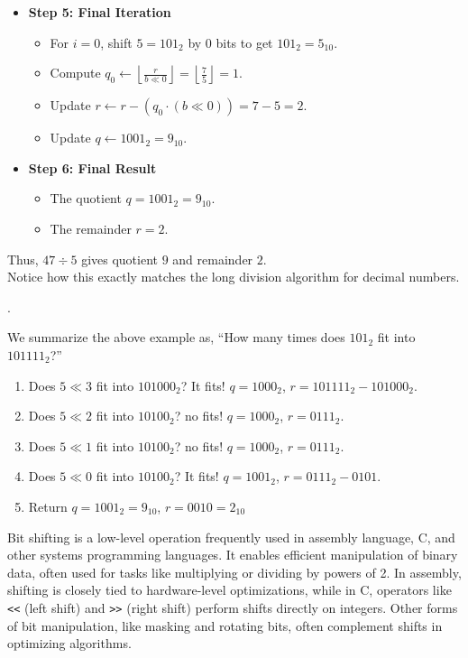 \begin{itemize}
    \item \textbf{Step 5: Final Iteration}
    \begin{itemize}
        \item For $i = 0$, shift $5 = 101_2$ by $0$ bits to get $101_2 = 5_{10}$.
        \item Compute $q_0 \gets \left\lfloor \frac{r}{b \ll 0} \right\rfloor = \left\lfloor \frac{7}{5} \right\rfloor = 1$.
        \item Update $r \gets r - (q_0 \cdot (b \ll 0)) = 7 - 5 = 2$.
        \item Update $q \gets 1001_2 = 9_{10}$.
    \end{itemize}
    
    \item \textbf{Step 6: Final Result}
    \begin{itemize}
        \item The quotient $q = 1001_2 = 9_{10}$.
        \item The remainder $r = 2$.
    \end{itemize}
\end{itemize}

\noindent
Thus, $47 \div 5$ gives quotient $9$ and remainder $2$.\\
Notice how this exactly matches the long division algorithm for decimal numbers.\\
\begin{center}
    .
\end{center}
We summarize the above example as, ``How many times does $101_2$ fit into $101111_2$?''
\begin{enumerate}
    \item  Does $5\ll 3$ fit into $101000_2$? It fits! $q=1000_2$, $r = 101111_2 - 101000_2$.
    \item  Does $5\ll 2$ fit into $10100_2$? no fits! $q=1000_2$, $r = 0111_2$.
    \item  Does $5\ll 1$ fit into $10100_2$? no fits! $q=1000_2$, $r = 0111_2$.
    \item  Does $5\ll 0$ fit into $10100_2$? It fits! $q=1001_2$, $r = 0111_2-0101$.
    \item  Return $q=1001_2=9_{10}$, $r = 0010 = 2_{10}$ 
\end{enumerate}

\begin{Tip}
    Bit shifting is a low-level operation frequently used in assembly language, C, and other systems programming languages. It enables efficient manipulation of binary data, often used for tasks like multiplying or dividing by powers of 2. In assembly, shifting is closely tied to hardware-level optimizations, while in C, operators like \texttt{<<} (left shift) and \texttt{>>} (right shift) perform shifts directly on integers. Other forms of bit manipulation, like masking and rotating bits, often complement shifts in optimizing algorithms.
\end{Tip}



